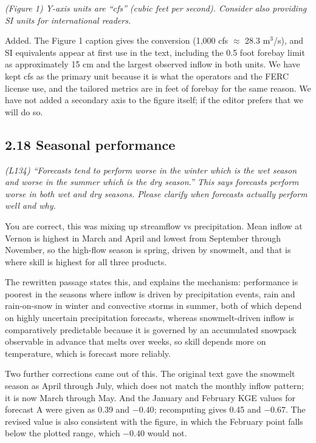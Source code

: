 \documentclass[11pt]{article}
\newenvironment{rc}%
  {\begin{list}{}{\setlength{\leftmargin}{1.5em}\setlength{\rightmargin}{1.5em}%
   \setlength{\topsep}{0.2em}\setlength{\parsep}{0pt}\setlength{\itemsep}{0pt}}%
   \item[]\itshape\color{quotegray}}%
  {\end{list}}
\begin{document}
\begin{rc}
(Figure 1) Y-axis units are ``cfs'' (cubic feet per second). Consider also providing SI
units for international readers.
\end{rc}

Added. The Figure 1 caption gives the conversion (1,000 cfs $\approx$ 28.3 m$^3$/s), and SI
equivalents appear at first use in the text, including the 0.5 foot forebay limit as approximately
15 cm and the largest observed inflow in both units. We have kept cfs as the primary unit because it
is what the operators and the FERC license use, and the tailored metrics are in feet of forebay for
the same reason. We have not added a secondary axis to the figure itself; if the editor prefers that
we will do so.

\subsection*{2.18 Seasonal performance}

\begin{rc}
(L134) ``Forecasts tend to perform worse in the winter which is the wet season and worse
in the summer which is the dry season.'' This says forecasts perform worse in both wet and
dry seasons. Please clarify when forecasts actually perform well and why.
\end{rc}

You are correct, this was mixing up streamflow vs precipitation. 
Mean inflow at Vernon is highest in March and April and lowest from
September through November, so the high-flow season is spring, driven by snowmelt, and that is
where skill is highest for all three products.

The rewritten passage states this, and explains the mechanism: performance is poorest in the
seasons where inflow is driven by precipitation events, rain and rain-on-snow in winter and
convective storms in summer, both of which depend on highly uncertain precipitation forecasts,
whereas snowmelt-driven inflow is comparatively predictable because it is governed by an
accumulated snowpack observable in advance that melts over weeks, so skill depends more on
temperature, which is forecast more reliably.

Two further corrections came out of this. The original text gave the snowmelt season as April
through July, which does not match the monthly inflow pattern; it is now March through May. And
the January and February KGE values for forecast A were given as 0.39 and $-0.40$; recomputing
gives 0.45 and $-0.67$. The revised value is also consistent with the figure, in which the
February point falls below the plotted range, which $-0.40$ would not.
\end{document}
